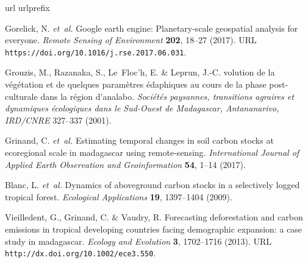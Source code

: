 \documentclass[
  12pt,
]{article}
\begin{document}
\begin{thebibliography}{99}
\expandafter\ifx\csname url\endcsname\relax
  \def\url#1{\texttt{#1}}\fi
\expandafter\ifx\csname urlprefix\endcsname\relax\def\urlprefix{URL }\fi
\providecommand{\bibinfo}[2]{#2}
\providecommand{\eprint}[2][]{\url{#2}}

\bibinfo{author}{Gorelick, N.} \emph{et~al.}
\newblock \bibinfo{title}{Google earth engine: Planetary-scale geospatial
  analysis for everyone}.
\newblock \emph{\bibinfo{journal}{Remote Sensing of Environment}}
  \textbf{\bibinfo{volume}{202}}, \bibinfo{pages}{18--27}
  (\bibinfo{year}{2017}).
\newblock \urlprefix\url{https://doi.org/10.1016/j.rse.2017.06.031}.

\bibinfo{author}{Grouzis, M.}, \bibinfo{author}{Razanaka, S.},
  \bibinfo{author}{Le~Floc’h, E.} \& \bibinfo{author}{Leprun, J.-C.}
\newblock \bibinfo{title}{{\'E}volution de la v{\'e}g{\'e}tation et de quelques
  param{\`e}tres {\'e}daphiques au cours de la phase post-culturale dans la
  r{\'e}gion d’analabo}.
\newblock \emph{\bibinfo{journal}{Soci{\'e}t{\'e}s paysannes, transitions
  agraires et dynamiques {\'e}cologiques dans le Sud-Ouest de Madagascar,
  Antananarivo, IRD/CNRE}} \bibinfo{pages}{327--337} (\bibinfo{year}{2001}).

\bibinfo{author}{Grinand, C.} \emph{et~al.}
\newblock \bibinfo{title}{Estimating temporal changes in soil carbon stocks at
  ecoregional scale in madagascar using remote-sensing}.
\newblock \emph{\bibinfo{journal}{International Journal of Applied Earth
  Observation and Geoinformation}} \textbf{\bibinfo{volume}{54}},
  \bibinfo{pages}{1--14} (\bibinfo{year}{2017}).

\bibinfo{author}{Blanc, L.} \emph{et~al.}
\newblock \bibinfo{title}{Dynamics of aboveground carbon stocks in a
  selectively logged tropical forest}.
\newblock \emph{\bibinfo{journal}{Ecological Applications}}
  \textbf{\bibinfo{volume}{19}}, \bibinfo{pages}{1397--1404}
  (\bibinfo{year}{2009}).

\bibinfo{author}{Vieilledent, G.}, \bibinfo{author}{Grinand, C.} \&
  \bibinfo{author}{Vaudry, R.}
\newblock \bibinfo{title}{Forecasting deforestation and carbon emissions in
  tropical developing countries facing demographic expansion: a case study in
  madagascar}.
\newblock \emph{\bibinfo{journal}{Ecology and Evolution}}
  \textbf{\bibinfo{volume}{3}}, \bibinfo{pages}{1702--1716}
  (\bibinfo{year}{2013}).
\newblock \urlprefix\url{http://dx.doi.org/10.1002/ece3.550}.


\end{thebibliography}
\end{document}
